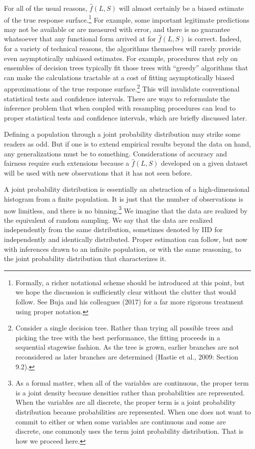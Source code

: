 \documentclass[12pt]{article}
\begin{document}
For all of the usual reasons, $\hat{f}(L,S)$ will almost certainly be a biased estimate of the true response surface.\footnote
{
Formally, a richer notational scheme should be introduced at this point, but we hope the discussion is sufficiently clear without the clutter that would follow. See Buja and his colleagues (2017) for a far more rigorous treatment using proper notation.
} 
For example, some important legitimate predictions may not be available or are measured with error, and there is no guarantee whatsoever that any functional form arrived at for $\hat{f}(L,S)$ is correct. Indeed, for a variety of technical reasons, the algorithms themselves will rarely provide even asymptotically unbiased estimates. For example, procedures that rely on ensembles of decision trees typically fit those trees with ``greedy'' algorithms that can make the calculations tractable at a cost of fitting asymptotically biased approximations of the true response surface.\footnote
{
Consider a single decision tree. Rather than trying all possible trees and picking the tree with the best performance, the fitting proceeds in a sequential stagewise fashion. As the tree is grown, earlier branches are not reconsidered as later branches are determined (Hastie et al., 2009: Section 9.2). 
}
This will invalidate conventional statistical tests and confidence intervals. There are ways to reformulate the inference problem that when coupled with resampling procedures can lead to proper statistical tests and confidence intervals, which are briefly discussed later.  

Defining a population through a joint probability distribution may strike some readers as odd. But if one is to extend empirical results beyond the data on hand, any generalizations must be to something. Considerations of accuracy and fairness require such extensions because a $\hat{f}(L,S)$ developed on a given dataset will be used with new observations that it has not seen before. 
 
A joint probability distribution is essentially an abstraction of a high-dimensional histogram from a finite population. It is just that the number of observations is now limitless, and there is no binning.\footnote
{
As a formal matter, when all of the variables are continuous, the proper term is a joint density because densities rather than probabilities are represented. When the variables are all discrete, the proper term is a joint probability distribution because probabilities are represented. When one does not want to commit to either or when some variables are continuous and some are discrete, one commonly uses the term joint probability distribution. That is how we proceed here. 
}
We imagine that the data are realized by the equivalent of random sampling. We say that the data are realized independently from the same distribution, sometimes denoted by IID for independently and identically distributed. Proper estimation can follow, but now with inferences drawn to an infinite population, or with the same reasoning, to the joint probability distribution that characterizes it. 
\end{document}
